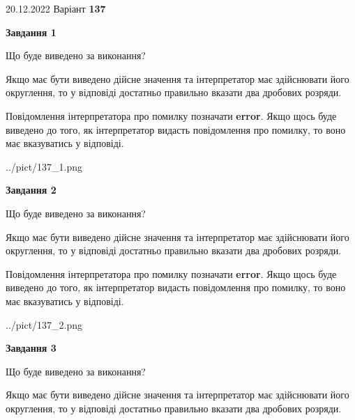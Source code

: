 \documentclass[12pt, ukrainian]{article}
\begin{document}
{20.12.2022 Варіант \No \textbf { 137 }\par}
{
\begin {Large}

{\begin {center}\textbf{Завдання 1}\end {center}}\par
Що буде виведено за виконання? \par

Якщо має бути виведено дійсне значення та інтерпретатор має здійснювати його округлення, 
то у відповіді достатньо правильно вказати два дробових розряди.

Повідомлення інтерпретатора про помилку позначати \textbf{error}.
Якщо щось буде виведено до того, як інтерпретатор видасть повідомлення про помилку, 
то воно має вказуватись у відповіді. \par

\begin{center}
	{../pict/137_1.png}
\end{center}
\newpage

{\begin {center}\textbf{Завдання 2}\end {center}}\par
Що буде виведено за виконання? \par

Якщо має бути виведено дійсне значення та інтерпретатор має здійснювати його округлення, 
то у відповіді достатньо правильно вказати два дробових розряди.

Повідомлення інтерпретатора про помилку позначати \textbf{error}.
Якщо щось буде виведено до того, як інтерпретатор видасть повідомлення про помилку, 
то воно має вказуватись у відповіді. \par

\begin{center}
	{../pict/137_2.png}
\end{center}
\newpage

{\begin {center}\textbf{Завдання 3}\end {center}}\par
Що буде виведено за виконання? \par

Якщо має бути виведено дійсне значення та інтерпретатор має здійснювати його округлення, 
то у відповіді достатньо правильно вказати два дробових розряди.


\end{Large}}
\end{document}
